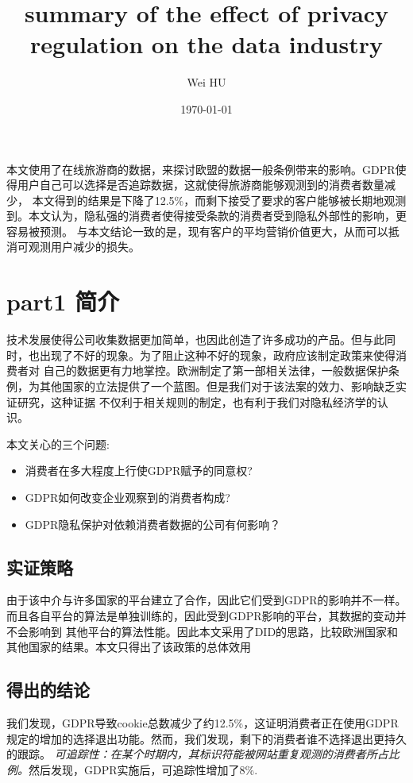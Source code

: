 \documentclass{article}
\begin{document}
\author{Wei HU}
\title{summary of the effect of privacy regulation on the data industry}
\date{\today}
\maketitle

本文使用了在线旅游商的数据，来探讨欧盟的数据一般条例带来的影响。GDPR使得用户自己可以选择是否追踪数据，这就使得旅游商能够观测到的消费者数量减少，
本文得到的结果是下降了12.5\%，而剩下接受了要求的客户能够被长期地观测到。本文认为，隐私强的消费者使得接受条款的消费者受到隐私外部性的影响，更容易被预测。
与本文结论一致的是，现有客户的平均营销价值更大，从而可以抵消可观测用户减少的损失。

\section*{part1 简介}
技术发展使得公司收集数据更加简单，也因此创造了许多成功的产品。但与此同时，也出现了不好的现象。为了阻止这种不好的现象，政府应该制定政策来使得消费者对
自己的数据更有力地掌控。欧洲制定了第一部相关法律，一般数据保护条例，为其他国家的立法提供了一个蓝图。但是我们对于该法案的效力、影响缺乏实证研究，这种证据
不仅利于相关规则的制定，也有利于我们对隐私经济学的认识。

本文关心的三个问题:
\begin{itemize}
    \item 消费者在多大程度上行使GDPR赋予的同意权?
    \item GDPR如何改变企业观察到的消费者构成?
    \item GDPR隐私保护对依赖消费者数据的公司有何影响？
\end{itemize}

\subsection*{实证策略}
由于该中介与许多国家的平台建立了合作，因此它们受到GDPR的影响并不一样。而且各自平台的算法是单独训练的，因此受到GDPR影响的平台，其数据的变动并不会影响到
其他平台的算法性能。因此本文采用了DID的思路，比较欧洲国家和其他国家的结果。本文只得出了该政策的总体效用

\subsection*{得出的结论}
我们发现，GDPR导致cookie总数减少了约12.5\%，这证明消费者正在使用GDPR规定的增加的选择退出功能。然而，我们发现，剩下的消费者谁不选择退出更持久的跟踪。
\textit{可追踪性：在某个时期内，其标识符能被网站重复观测的消费者所占比例。}然后发现，GDPR实施后，可追踪性增加了8\%.
\end{document}
